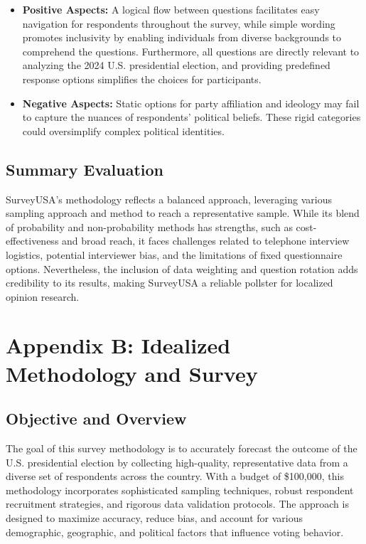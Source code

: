 \documentclass[
  letterpaper,
  DIV=11,
  numbers=noendperiod]{scrartcl}
\providecommand{\tightlist}{%
  \setlength{\itemsep}{0pt}\setlength{\parskip}{0pt}}\usepackage{longtable,booktabs,array}
\begin{document}
\begin{itemize}
\tightlist
\item
  \textbf{Positive Aspects:} A logical flow between questions
  facilitates easy navigation for respondents throughout the survey,
  while simple wording promotes inclusivity by enabling individuals from
  diverse backgrounds to comprehend the questions. Furthermore, all
  questions are directly relevant to analyzing the 2024 U.S.
  presidential election, and providing predefined response options
  simplifies the choices for participants.\\
\item
  \textbf{Negative Aspects:} Static options for party affiliation and
  ideology may fail to capture the nuances of respondents' political
  beliefs. These rigid categories could oversimplify complex political
  identities.\\
\end{itemize}

\subsection{\texorpdfstring{Summary Evaluation\\
}{Summary Evaluation }}\label{summary-evaluation}

SurveyUSA's methodology reflects a balanced approach, leveraging various
sampling approach and method to reach a representative sample. While its
blend of probability and non-probability methods has strengths, such as
cost-effectiveness and broad reach, it faces challenges related to
telephone interview logistics, potential interviewer bias, and the
limitations of fixed questionnaire options. Nevertheless, the inclusion
of data weighting and question rotation adds credibility to its results,
making SurveyUSA a reliable pollster for localized opinion research.

\section{Appendix B: Idealized Methodology and
Survey}\label{appendix-b-idealized-methodology-and-survey}

\subsection{\texorpdfstring{\textbf{Objective and
Overview}}{Objective and Overview}}\label{objective-and-overview}

The goal of this survey methodology is to accurately forecast the
outcome of the U.S. presidential election by collecting high-quality,
representative data from a diverse set of respondents across the
country. With a budget of \$100,000, this methodology incorporates
sophisticated sampling techniques, robust respondent recruitment
strategies, and rigorous data validation protocols. The approach is
designed to maximize accuracy, reduce bias, and account for various
demographic, geographic, and political factors that influence voting
behavior.
\end{document}

